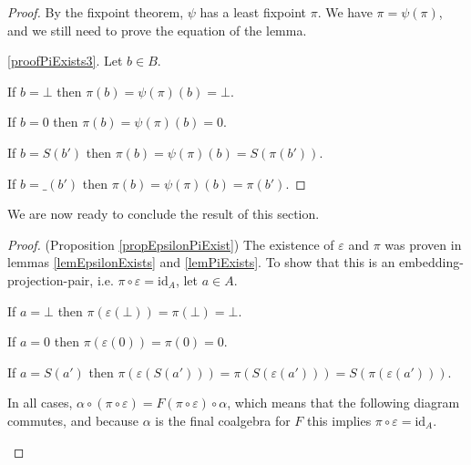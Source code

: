 \documentclass[a4paper]{article}
\begin{document}
\begin{proof}
By the fixpoint theorem, $\psi$ has a least fixpoint $\pi$. We have $\pi =
\psi(\pi)$, and we still need to prove the equation of the lemma.

\ref{proofPiExists3}. Let $b \in B$.

If $b = \bot$ then $\pi(b) = \psi(\pi)(b) = \bot$.

If $b = 0$ then $\pi(b) = \psi(\pi)(b) = 0$.

If $b = S(b')$ then $\pi(b) = \psi(\pi)(b) = S(\pi(b'))$.

If $b = \_(b')$ then $\pi(b) = \psi(\pi)(b) = \pi(b')$.
\end{proof}

We are now ready to conclude the result of this section.

\begin{proof}
(Proposition \ref{propEpsilonPiExist}) The existence of $\varepsilon$ and $\pi$
was proven in lemmas \ref{lemEpsilonExists} and \ref{lemPiExists}. To show that
this is an embedding-projection-pair, i.e. $\pi \circ \varepsilon =
\text{id}_A$, let $a \in A$.

If $a = \bot$ then $\pi(\varepsilon(\bot)) = \pi(\bot) = \bot$.

If $a = 0$ then $\pi(\varepsilon(0)) = \pi(0) = 0$.

If $a = S(a')$ then $\pi(\varepsilon(S(a'))) = \pi(S(\varepsilon(a'))) =
S(\pi(\varepsilon(a')))$.

In all cases, $\alpha \circ (\pi \circ \varepsilon) = F(\pi \circ \varepsilon)
\circ \alpha$, which means that the following diagram commutes, and because
$\alpha$ is the final coalgebra for $F$ this implies $\pi \circ \varepsilon =
\text{id}_A$.
\begin{figure}[h]
\begin{center}
\end{center}
\end{figure}
\end{proof}
\end{document}

